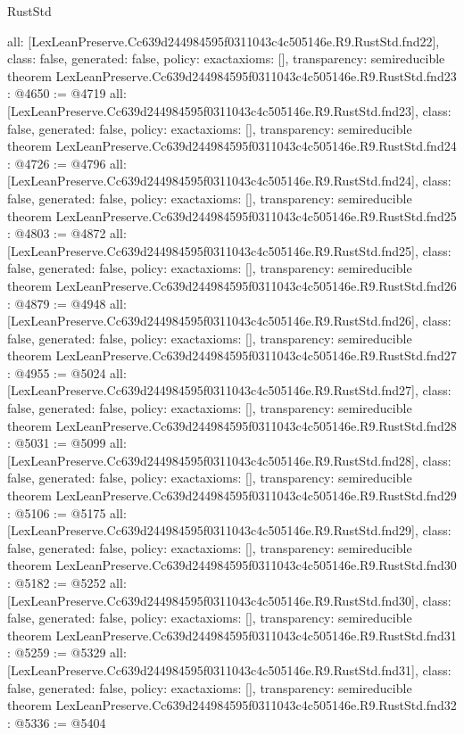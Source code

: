 \begin{lexlean}{RustStd}
\begin{coremodule}
{  all: [LexLeanPreserve.Cc639d244984595f0311043c4c505146e.R9.RustStd.fnd22],
  class: false,
  generated: false,
  policy: exact{axioms: []},
  transparency: semireducible
}
theorem LexLeanPreserve.Cc639d244984595f0311043c4c505146e.R9.RustStd.fnd23 : @4650 := @4719 {
  all: [LexLeanPreserve.Cc639d244984595f0311043c4c505146e.R9.RustStd.fnd23],
  class: false,
  generated: false,
  policy: exact{axioms: []},
  transparency: semireducible
}
theorem LexLeanPreserve.Cc639d244984595f0311043c4c505146e.R9.RustStd.fnd24 : @4726 := @4796 {
  all: [LexLeanPreserve.Cc639d244984595f0311043c4c505146e.R9.RustStd.fnd24],
  class: false,
  generated: false,
  policy: exact{axioms: []},
  transparency: semireducible
}
theorem LexLeanPreserve.Cc639d244984595f0311043c4c505146e.R9.RustStd.fnd25 : @4803 := @4872 {
  all: [LexLeanPreserve.Cc639d244984595f0311043c4c505146e.R9.RustStd.fnd25],
  class: false,
  generated: false,
  policy: exact{axioms: []},
  transparency: semireducible
}
theorem LexLeanPreserve.Cc639d244984595f0311043c4c505146e.R9.RustStd.fnd26 : @4879 := @4948 {
  all: [LexLeanPreserve.Cc639d244984595f0311043c4c505146e.R9.RustStd.fnd26],
  class: false,
  generated: false,
  policy: exact{axioms: []},
  transparency: semireducible
}
theorem LexLeanPreserve.Cc639d244984595f0311043c4c505146e.R9.RustStd.fnd27 : @4955 := @5024 {
  all: [LexLeanPreserve.Cc639d244984595f0311043c4c505146e.R9.RustStd.fnd27],
  class: false,
  generated: false,
  policy: exact{axioms: []},
  transparency: semireducible
}
theorem LexLeanPreserve.Cc639d244984595f0311043c4c505146e.R9.RustStd.fnd28 : @5031 := @5099 {
  all: [LexLeanPreserve.Cc639d244984595f0311043c4c505146e.R9.RustStd.fnd28],
  class: false,
  generated: false,
  policy: exact{axioms: []},
  transparency: semireducible
}
theorem LexLeanPreserve.Cc639d244984595f0311043c4c505146e.R9.RustStd.fnd29 : @5106 := @5175 {
  all: [LexLeanPreserve.Cc639d244984595f0311043c4c505146e.R9.RustStd.fnd29],
  class: false,
  generated: false,
  policy: exact{axioms: []},
  transparency: semireducible
}
theorem LexLeanPreserve.Cc639d244984595f0311043c4c505146e.R9.RustStd.fnd30 : @5182 := @5252 {
  all: [LexLeanPreserve.Cc639d244984595f0311043c4c505146e.R9.RustStd.fnd30],
  class: false,
  generated: false,
  policy: exact{axioms: []},
  transparency: semireducible
}
theorem LexLeanPreserve.Cc639d244984595f0311043c4c505146e.R9.RustStd.fnd31 : @5259 := @5329 {
  all: [LexLeanPreserve.Cc639d244984595f0311043c4c505146e.R9.RustStd.fnd31],
  class: false,
  generated: false,
  policy: exact{axioms: []},
  transparency: semireducible
}
theorem LexLeanPreserve.Cc639d244984595f0311043c4c505146e.R9.RustStd.fnd32 : @5336 := @5404 {
}
\end{coremodule}
\end{lexlean}
